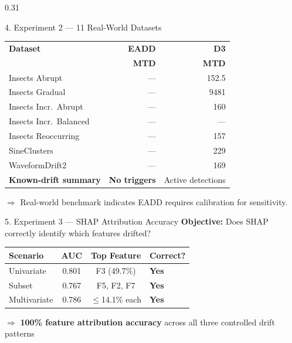 \documentclass[final]{beamer}
\begin{document}
\begin{frame}[t]
\begin{columns}[t]
\begin{column}{0.31\textwidth}
\begin{block}{4. Experiment 2 — 11 Real-World Datasets}
\vskip0.5cm
\begin{table}
\centering
\renewcommand{\arraystretch}{1.2}
\begin{tabular}{lrr}
\toprule
\textbf{Dataset} & \textbf{EADD} & \textbf{D3} \\
 & \textbf{MTD} & \textbf{MTD} \\
\midrule
Insects Abrupt       & ---   & 152.5 \\
Insects Gradual      & --- & 9481 \\
Insects Incr.\ Abrupt   & ---    & 160   \\
Insects Incr.\ Balanced & ---   & --- \\
Insects Reoccurring  & ---  & 157   \\
SineClusters         & ---  & 229   \\
WaveformDrift2       & ---  & 169   \\
\midrule
\textbf{Known-drift summary} & \textbf{No triggers} & Active detections \\
\bottomrule
\end{tabular}
\end{table}

\vskip0.3cm
{\color{MahidolBlue}$\Rightarrow$} Real-world benchmark indicates EADD requires calibration for sensitivity.
\end{block}

\vskip1cm

\begin{block}{5. Experiment 3 — SHAP Attribution Accuracy}
\large
\textbf{Objective:} Does SHAP correctly identify which features drifted?

\vskip0.5cm
\begin{table}
\centering
\renewcommand{\arraystretch}{1.3}
\begin{tabular}{lccl}
\toprule
\textbf{Scenario} & \textbf{AUC} & \textbf{Top Feature} & \textbf{Correct?} \\
\midrule
Univariate    & 0.801 & F3 (49.7\%)   & \color{AccentGreen}\textbf{Yes} \\
Subset        & 0.767 & F5, F2, F7       & \color{AccentGreen}\textbf{Yes} \\
Multivariate  & 0.786 & $\leq$14.1\% each & \color{AccentGreen}\textbf{Yes} \\
\bottomrule
\end{tabular}
\end{table}

\vskip0.3cm
{\color{MahidolBlue}$\Rightarrow$} \textbf{100\% feature attribution accuracy} across all three controlled drift patterns
\end{block}


\end{column}
\end{columns}
\end{frame}
\end{document}
